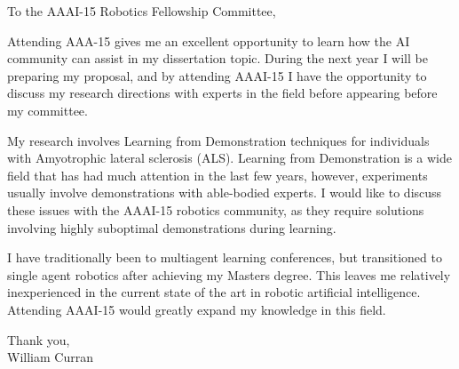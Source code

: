 \documentclass[10pt,a4paper]{letter}
\begin{document}
 
\begin{letter}{} 
\opening{To the AAAI-15 Robotics Fellowship Committee,} 
Attending AAA-15 gives me an excellent opportunity to learn how the AI community can assist in my dissertation topic. During the next year I will be preparing my proposal, and by attending AAAI-15 I have the opportunity to discuss my research directions with experts in the field before appearing before my committee. 

My research involves Learning from Demonstration techniques for individuals with Amyotrophic lateral sclerosis (ALS). Learning from Demonstration is a wide field that has had much attention in the last few years, however, experiments usually involve demonstrations with able-bodied experts. I would like to discuss these issues with the AAAI-15 robotics community, as they require solutions involving highly suboptimal demonstrations during learning. 

I have traditionally been to multiagent learning conferences, but transitioned to single agent robotics after achieving my Masters degree. This leaves me relatively inexperienced in the current state of the art in robotic artificial intelligence. Attending AAAI-15 would greatly expand my knowledge in this field.

\closing{Thank you, \\
William Curran}
\end{letter} 
\end{document}
